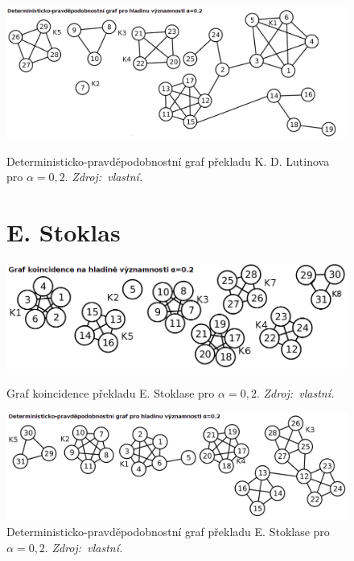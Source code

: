 \documentclass[dp.tex]{subfiles}
\begin{document}
\begin{figure}[t]
	{
		\centering
		\includegraphics[max width=\textwidth,keepaspectratio=true]{imgs-99-priloha-d/d_d_20}
		\caption[Deterministicko-pravděpodobnostní graf překladu K. D. Lutinova pro $\alpha = 0{,}2$]
	            {Deterministicko-pravděpodobnostní graf překladu K. D. Lutinova pro $\alpha = 0{,}2$. \textit{Zdroj:~vlastní.}}
		\label{fig:d_d_20}
	}

	\vspace*{1.5cm}

\section*{E. Stoklas}
	
	\centering
	\includegraphics[max width=\textwidth,keepaspectratio=true]{imgs-99-priloha-d/h_k_20}
	\caption[Graf koincidence překladu E. Stoklase pro $\alpha = 0{,}2$]
            {Graf koincidence překladu E. Stoklase pro $\alpha = 0{,}2$. \textit{Zdroj:~vlastní.}}
	\label{fig:h_k_20}

	\vspace*{0.5cm}

	\includegraphics[max width=\textwidth,keepaspectratio=true]{imgs-99-priloha-d/h_d_20}
	\caption[Deterministicko-pravděpodobnostní graf překladu E. Stoklase pro $\alpha = 0{,}2$]
            {Deterministicko-pravděpodobnostní graf překladu E. Stoklase pro $\alpha = 0{,}2$. \textit{Zdroj:~vlastní.}}
	\label{fig:h_d_20}
\end{figure}
\end{document}
